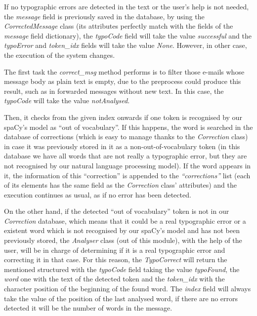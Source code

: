 If no typographic errors are detected in the text or the user's help is not needed, the \textit{message} field is previously saved in the database, by using the \textit{CorrectedMessage} class (its attributes perfectly match with the fields of the \textit{message} field dictionary), the \textit{typoCode} field will take the value \textit{successful} and the \textit{typoError} and \textit{token\_idx} fields will take the value \textit{None}. However, in other case, the execution of the system changes.

The first task the \textit{correct\_msg} method performs is to filter those e-mails whose message body as plain text is empty, due to the preprocess could produce this result, such as in forwarded messages without new text. In this case, the \textit{typoCode} will take the value \textit{notAnalysed}.

Then, it checks from the given index onwards if one token is recognised by our spaCy's model as ``out of vocabulary''. If this happens, the word is searched in the database of corrections (which is easy to manage thanks to the \textit{Correction} class) in case it was previously stored in it as a non-out-of-vocabulary token (in this database we have all words that are not really a typographic error, but they are not recognised by our natural language processing model). If the word appears in it, the information of this ``correction'' is appended to the \textit{``corrections''} list (each of its elements has the same field as the \textit{Correction} class' attributes) and the execution continues as usual, as if no error has been detected.

On the other hand, if the detected ``out of vocabulary'' token is not in our \textit{Correction} database, which means that it could be a real typographic error or a existent word which is not recognised by our spaCy's model and has not been previously stored, the \textit{Analyser} class (out of this module), with the help of the user, will be in charge of determining if it is a real typographic error and correcting it in that case. For this reason, the \textit{TypoCorrect} will return the mentioned structured with the \textit{typoCode} field taking the value \textit{typoFound}, the \textit{word} one with the text of the detected token and the \textit{token\_idx} with the character position of the beginning of the found word. The \textit{index} field will always take the value of the position of the last analysed word, if there are no errors detected it will be the number of words in the message.

